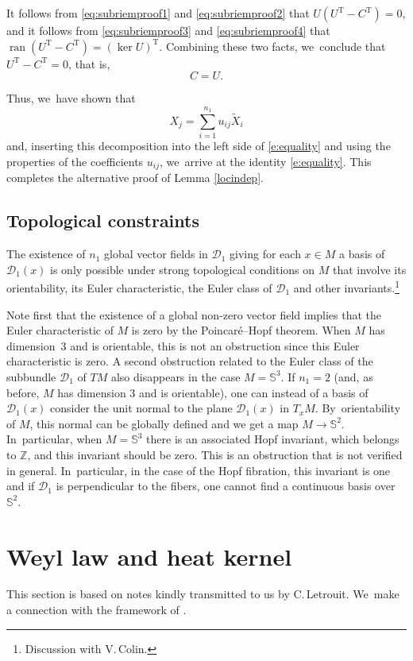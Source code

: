 \documentclass[10pt]{amsart}
\theoremstyle{definition}
\newcommand{\1}{\mathbbm{1}}
\newcommand{\Sph}{\mathbb{S}}
\DeclareMathOperator{\ran}{ran}
\begin{document}
It follows from \eqref{eq:subriemproof1} and \eqref{eq:subriemproof2} that $U(U^\mathrm{T} - C^\mathrm{T}) = 0$, and it follows from \eqref{eq:subriemproof3} and \eqref{eq:subriemproof4} that $\ran(U^\mathrm{T} - C^\mathrm{T}) = (\ker U)^\mathrm{T}$. Combining these two facts, we~conclude that $U^\mathrm{T} - C^\mathrm{T}=0$, that is,
\[
C = U.
\]

Thus, we~have shown that
\[
X_j = \sum_{i=1}^{n_1} u_{ij} \tilde X_i
\]
and, inserting this decomposition into the left side of \eqref{e:equality} and using the properties of the coefficients $u_{ij}$, we~arrive at the identity \eqref{e:equality}. This completes the alternative proof of Lemma \ref{locindep}.

\subsection{Topological constraints}\label{ssA.4}
The existence of $n_1$ global vector fields in $\mathcal D_1$ giving for each
$x\in M$ a basis of $\mathcal D_1(x)$ is only possible under strong topological conditions on $M$ that involve its orientability, its Euler characteristic, the Euler class of $\mathcal D_1$ and other invariants.\footnote{Discussion with V.\,Colin.}

Note first that the existence of a global non-zero vector field implies that the Euler characteristic of $M$ is zero by the Poincaré--Hopf theorem.
When $M$ has dimension~3 and is orientable, this is not an obstruction since this Euler characteristic is zero. A second obstruction related to the Euler class of the subbundle $\mathcal D_1$ of $TM$ also disappears in the case $M=\mathbb S^3$. If $n_1=2$ (and, as before, $M$ has dimension 3 and is orientable), one can instead of a basis of $\mathcal D_1(x)$ consider the unit normal to the plane $\mathcal D_1(x)$ in $T_x M$. By~orientability of $M$, this normal can be globally defined and we get a map $M \to \Sph^2$. In~particular, when $M=\mathbb S^3$ there is an associated Hopf invariant, which belongs to $\mathbb Z$, and this invariant should be zero. This is an obstruction that is not verified in general. In~particular, in the case of the Hopf fibration, this invariant is one and if $\mathcal D_1$ is perpendicular to the fibers, one cannot find a continuous basis over~$\mathbb S^2$.

\section{Weyl law and heat kernel}\label{AppC}
This section is based on notes kindly transmitted to us by C.\,Letrouit. We~make a connection with the framework of \cite{CHT1}.
\end{document}
